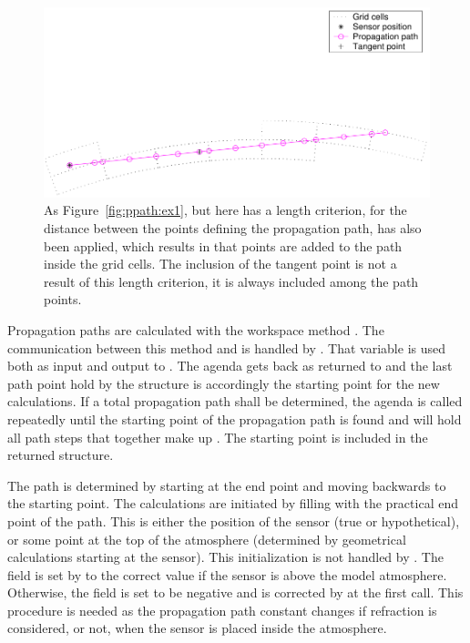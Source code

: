 \begin{figure}[!t]
 \begin{center}
   \includegraphics*[width=0.98\hsize]{Figs/ppath/ppath_ex2}
  \caption{As Figure~\ref{fig:ppath:ex1}, but here has a length 
    criterion, for the distance between the points defining the
    propagation path, has also been applied, which results in that points
    are added to the path inside the grid cells. The inclusion of the
    tangent point is not a result of this length criterion, it is
    always included among the path points.}
  \label{fig:ppath:ex2}  
 \end{center}
\end{figure}


Propagation paths are calculated with the workspace method
. The communication between this method and
 is handled by .
That variable is used both as input and output to
.  The agenda gets back
 as returned to  and the
last path point hold by the structure is accordingly the starting
point for the new calculations. If a total propagation path shall be
determined, the agenda is called repeatedly until the starting point
of the propagation path is found and  will hold
all path steps that together make up . The starting
point is included in the returned structure.

The path is determined by starting at the end point and moving
backwards to the starting point. The calculations are initiated by
filling  with the practical end point of the
path. This is either the position of the sensor (true or
hypothetical), or some point at the top of the atmosphere (determined
by geometrical calculations starting at the sensor). This
initialization is not handled by . 
The field  is set by 
to the correct value if the sensor is above the model atmosphere.
Otherwise, the field is set to be negative and is corrected by
 at the first call. This procedure is
needed as the propagation path constant changes if refraction is
considered, or not, when the sensor is placed inside the atmosphere.


